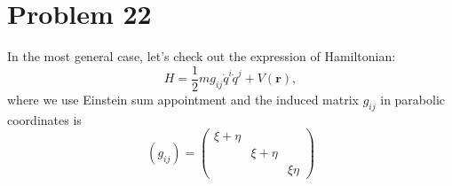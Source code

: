 \section*{Problem 22}

In the most general case, let's check out the expression of Hamiltonian:
\begin{equation}
    H = \frac{1}{2} m g_{ij} \dot{q}^i \dot{q}^j  +  V\left(\boldsymbol{r}\right),
\end{equation}
where we use Einstein sum appointment and the induced matrix $g_{ij}$ in parabolic coordinates is
\begin{equation}
    \left(g_{ij}\right)  = \left(
    \begin{matrix}
        \xi + \eta  &               &           \\
                    & \xi + \eta    &           \\
                    &               &  \xi\eta
    \end{matrix}
    \right)
\end{equation}